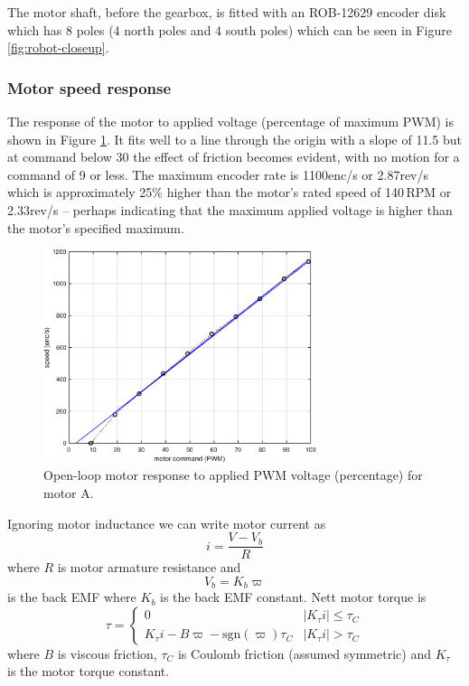 \documentclass[11pt,fleqn]{article}
\begin{document}
The motor shaft, before the gearbox, is fitted with an ROB-12629 encoder disk which has 8  poles (4 north poles and 4 south poles) which can be
seen in Figure \ref{fig:robot-closeup}.


\subsubsection{Motor speed response}\label{sec:motor-control}

The response of the motor to applied voltage (percentage of maximum PWM) is shown in Figure \ref{fig:motor-response}. 
It fits well to a line through the origin with a slope of 11.5 but at command below 30 the effect of friction becomes
evident, with no motion for a command of 9 or less.
The maximum encoder rate is 1100\unit{enc/s} or 2.87\unit{rev/s} which is approximately 25\% higher than the motor's rated speed
of 140\,RPM or 2.33\unit{rev/s} -- perhaps indicating that the maximum applied voltage is higher than the motor's specified maximum.

\begin{figure}
\centering
\includegraphics[width=8cm]{motor.eps}
\caption{Open-loop motor response to applied PWM voltage (percentage) for motor A.}
\label{fig:motor-response}
\end{figure}

Ignoring motor inductance  we can write motor current as
\begin{equation}
i = \frac{V - V_b}{R} \label{eq:current}
\end{equation}
where $R$ is motor armature resistance and
\begin{equation}
V_b = K_b \varpi \label{eq:bemf}
\end{equation}
is the back EMF where $K_b$ is the back EMF constant.
Nett motor torque is
\begin{equation}
\tau = \left\{ \begin{array}{ll} 0 & |K_\tau i| \le \tau_C \\ K_\tau i - B\varpi - \mathrm{sgn}(\varpi )\tau_C & |K_\tau i| > \tau_C \end{array} \right. \label{eq:torque}
\end{equation}
where $B$ is viscous friction, $\tau_C$ is Coulomb friction (assumed symmetric) and $K_\tau$ is the motor torque constant.
\end{document}

